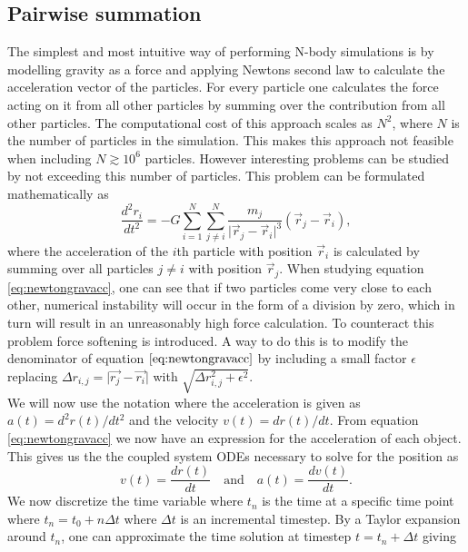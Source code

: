\subsection{Pairwise summation}
The simplest and most intuitive way of performing N-body simulations is by
modelling gravity as a force and applying Newtons second law to calculate the
acceleration vector of the particles. For every particle one calculates the
force acting on it from all other particles by summing over the contribution
from all other particles. The computational cost of this approach scales as
$N^2$, where $N$ is the number of particles in the simulation. This makes this
approach not feasible when including $N\gtrsim10^6$ particles. However
interesting problems can be studied by not exceeding this number of particles. This problem can be formulated mathematically as
\begin{equation}\label{eq:newtongravacc}
    \frac{d^2r_i}{dt^2}=-G\sum_{i=1}^{N}\sum_{j\neq i}^N\frac{m_j}{\vert\vec{r}_j-\vec{r}_i\vert^3}(\vec{r}_j-\vec{r}_i),
\end{equation}
where the acceleration of the $i$th particle with position
$\vec{r}_i$ is calculated by summing over all particles $j\neq i$ with position $\vec{r}_j$.
When studying equation \ref{eq:newtongravacc}, one can see that if two particles
come very close to each other, numerical instability will occur in the form of a division by
zero, which in turn will result in an unreasonably high force calculation. To counteract this problem
force softening is introduced. A way to do this is to modify the denominator of
equation $\ref{eq:newtongravacc}$ by including a small factor $\epsilon$
replacing $\Delta r_{i,j}=\vert\vec{r_j}-\vec{r_i}\vert$ with $\sqrt{\Delta
r_{i,j}^2+\epsilon^2}$\cite[ch.2]{Fazio2309855}. \\\indent
We will now use the notation where the acceleration is
given as $a(t)=d^2r(t)/dt^2$ and the velocity $v(t)=dr(t)/dt$.
From equation \ref{eq:newtongravacc} we now have an expression for the acceleration of each object.
This gives us the the coupled system ODEs necessary to solve for the position as
\begin{equation}
    v(t)=\frac{dr(t)}{dt} \quad\mathrm{and}\quad a(t)=\frac{dv(t)}{dt}.
\end{equation}
We now discretize the time variable where $t_n$ is the time at a specific
time point where $t_n=t_0+n\Delta t $ where $\Delta t$ is an incremental
timestep. By a Taylor expansion around $t_n$, one can approximate the time
solution at timestep $t=t_n+\Delta t$ giving
